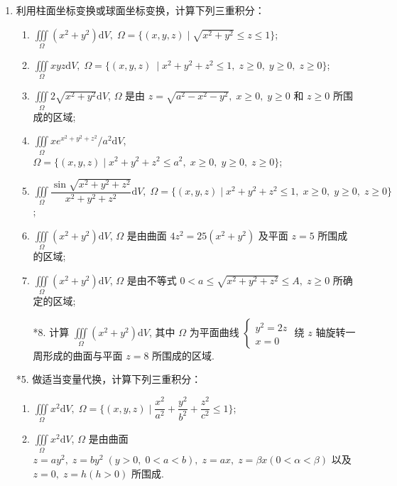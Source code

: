 \begin{enumerate}
    \item 利用柱面坐标变换或球面坐标变换，计算下列三重积分：
    \begin{enumerate}[(1)]\setlength{\itemsep}{5pt}\setlength{\topsep}{15pt}
        \item $\displaystyle\iiint\limits_{\Omega}(x^2+y^2)\text{d}V,\;\Omega=\{(x, y, z) \mid \sqrt{x^2+y^2}\leqslant z\leqslant 1\}$;
        \item $\displaystyle\iiint\limits_{\Omega}xyz\text{d}V,\;\Omega=\{(x, y, z)\ \mid x^2+y^2+z^2\leqslant 1,\;z\geqslant 0,\;y\geqslant 0,\;z\geqslant 0\}$;
        \item $\displaystyle\iiint\limits_{\Omega}2\sqrt{x^2+y^2}\text{d}V$, $\Omega$ 是由 $z=\sqrt{a^2-x^2-y^2},\;x\geqslant 0,\;y\geqslant 0$ 和 $z\geqslant 0$ 所围成的区域;
        \item $\displaystyle\iiint\limits_{\Omega}xe^{x^2+y^2+z^2}/a^2\text{d}V$, $\Omega=\{(x, y, z) \mid x^2+y^2+z^2\leqslant a^2,\;x\geqslant 0,\;y\geqslant 0,\;z\geqslant0\}$;
        \item $\displaystyle\iiint\limits_{\Omega}\dfrac{\sin\sqrt{x^2+y^2+z^2}}{x^2+y^2+z^2}\text{d}V,\;\Omega=\{(x, y, z) \mid x^2+y^2+z^2\leqslant 1,\;x\geqslant 0,\;y\geqslant 0,\;z\geqslant 0\}$;
        \item $\displaystyle\iiint\limits_{\Omega}(x^2+y^2)\text{d}V$, $\Omega$ 是由曲面 $4z^2=25(x^2+y^2)$ 及平面 $z=5$ 所围成的区域;
        \item $\displaystyle\iiint\limits_{\Omega}(x^2+y^2)\text{d}V$, $\Omega$ 是由不等式 $0<a\leqslant \sqrt{x^2+y^2+z^2}\leqslant A,\;z\geqslant0$ 所确定的区域;
        \item[*8.] 计算 $\displaystyle\iiint\limits_{\Omega}(x^2+y^2)\text{d}V$, 其中 $\Omega$ 为平面曲线 $\begin{cases}
            y^2=2z\\
            x=0
        \end{cases}$ 绕 $z$ 轴旋转一周形成的曲面与平面 $z=8$ 所围成的区域.
    \end{enumerate}

    \item[*5.] 做适当变量代换，计算下列三重积分：
    \begin{enumerate}[(1)]\setlength{\itemsep}{5pt}\setlength{\topsep}{15pt}
        \item $\displaystyle\iiint\limits_{\Omega}x^2\text{d}V,\;\Omega=\{(x, y, z) \mid \dfrac{x^2}{a^2}+\dfrac{y^2}{b^2}+\dfrac{z^2}{c^2}\leqslant 1\}$;
        \item $\displaystyle\iiint\limits_{\Omega}x^2\text{d}V$, $\Omega$ 是由曲面 $z=ay^2,\;z=by^2\;(y>0,\;0<a<b),\;z=ax,\;z=\beta x(0<\alpha<\beta)$ 以及 $z=0,\;z=h(h>0)$ 所围成.    
    \end{enumerate}  


\end{enumerate}
